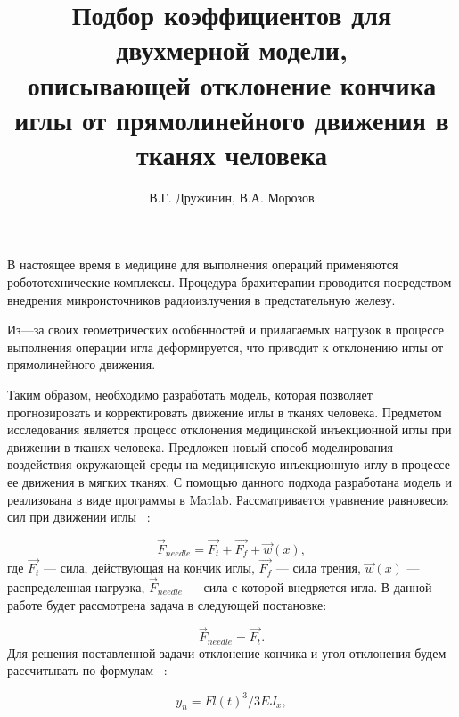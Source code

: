 \documentclass[twoside]{article}
\begin{document}
\title{Подбор коэффициентов для двухмерной модели,\\ описывающей отклонение кончика иглы от 
прямолинейного движения в тканях человека }%
\author{В.Г. Дружинин, В.А. Морозов}%
\maketitle


\bigskip
В настоящее время в медицине для выполнения операций применяются робототехнические комплексы. Процедура брахитерапии проводится посредством внедрения микроисточников радиоизлучения в предстательную железу. 

Из---за своих геометрических особенностей и прилагаемых нагрузок в процессе выполнения операции игла деформируется, что приводит к отклонению иглы от прямолинейного движения.

Таким образом, необходимо разработать модель, которая позволяет прогнозировать и корректировать движение иглы в тканях человека. Предметом исследования является процесс отклонения медицинской инъекционной иглы при движении в тканях человека. Предложен новый способ моделирования воздействия окружающей среды на медицинскую инъекционную иглу в процессе ее движения в мягких тканях. С помощью данного подхода разработана модель и реализована в виде программы в Matlab.
Рассматривается уравнение равновесия сил при движении иглы ~\cite{Model}: 

\begin{equation} \label{eq1}
\Vec{F}_{needle} = \Vec{F_{t}} + \Vec{F_{f}} + \Vec{w}(x),
\end{equation}
где $\Vec{F_{t}}$ --- сила, действующая на кончик иглы, $\Vec{F_{f}}$ --- сила трения, $\Vec{w}(x)$ --- распределенная нагрузка, $\Vec{F}_{needle}$ --- сила с которой внедряется игла.
В данной работе будет рассмотрена  задача в следующей постановке:

\begin{equation} \label{eq2}
\Vec{F}_{needle} = \Vec{F_{t}}.
\end{equation}
Для решения поставленной задачи отклонение кончика и угол отклонения будем рассчитывать по формулам ~\cite{Model}:

\begin{equation} \label{eq3}
y_{n} = Fl(t)^3 / 3EJ_{x},
\end{equation}
\end{document}
